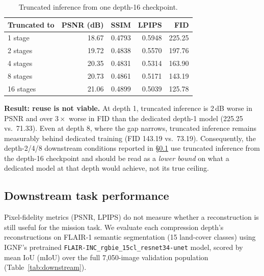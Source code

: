 \begin{table}[h]
\centering
\caption{Truncated inference from one depth-16 checkpoint.}
\label{tab:truncation}
\begin{tabular}{lrrrr}
\toprule
Truncated to & PSNR (dB) & SSIM & LPIPS & FID \\
\midrule
1 stage   & 18.67 & 0.4793 & 0.5948 & 225.25 \\
2 stages  & 19.72 & 0.4838 & 0.5570 & 197.76 \\
4 stages  & 20.35 & 0.4831 & 0.5314 & 163.90 \\
8 stages  & 20.73 & 0.4861 & 0.5171 & 143.19 \\
16 stages & 21.06 & 0.4899 & 0.5039 & 125.78 \\
\bottomrule
\end{tabular}
\end{table}

\textbf{Result: reuse is not viable.} At depth 1, truncated inference is
2\,dB worse in PSNR and over $3\times$ worse in FID than the dedicated
depth-1 model (225.25 vs.\ 71.33). Even at depth 8, where the gap narrows,
truncated inference remains measurably behind dedicated training (FID 143.19
vs.\ 73.19). Consequently, the depth-2/4/8 downstream conditions reported in
\S\ref{sec:downstream} use truncated inference from the depth-16 checkpoint
and should be read as a \emph{lower bound} on what a dedicated model at that
depth would achieve, not its true ceiling.

\subsection{Downstream task performance}
\label{sec:downstream}

Pixel-fidelity metrics (PSNR, LPIPS) do not measure whether a reconstruction
is still useful for the mission task. We evaluate each compression depth's
reconstructions on FLAIR-1 semantic segmentation (15 land-cover classes)
using IGNF's pretrained \texttt{FLAIR-INC\_rgbie\_15cl\_resnet34-unet} model,
scored by mean IoU (mIoU) over the full 7{,}050-image validation population
(Table~\ref{tab:downstream}).


